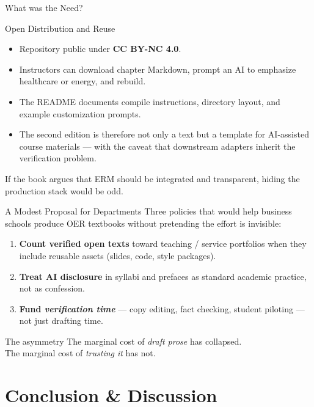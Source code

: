 \documentclass[11pt, aspectratio=169]{beamer}
\begin{document}
\begin{frame}{What was the Need?}
\begin{frame}{Open Distribution and Reuse}
\begin{itemize}
  \item Repository public under \textbf{CC BY-NC 4.0}.
  \item Instructors can download chapter Markdown, prompt an AI to emphasize
        healthcare or energy, and rebuild.
  \item The README documents compile instructions, directory layout,
        and example customization prompts.
  \item The second edition is therefore not only a text but a
        \alert{template} for AI-assisted course materials ---
        with the caveat that downstream adapters inherit the verification problem.
\end{itemize}
\medskip
\small If the book argues that ERM should be integrated and transparent,
hiding the production stack would be odd.
\end{frame}

\begin{frame}{A Modest Proposal for Departments}
Three policies that would help business schools produce OER textbooks without
pretending the effort is invisible:
\begin{enumerate}
  \item \textbf{Count verified open texts} toward teaching / service portfolios
        when they include reusable assets (slides, code, style packages).
  \item \textbf{Treat AI disclosure} in syllabi and prefaces as standard academic
        practice, not as confession.
  \item \textbf{Fund \emph{verification time}} --- copy editing, fact checking,
        student piloting --- not just drafting time.
\end{enumerate}
\medskip
\begin{alertblock}{The asymmetry}
The marginal cost of \emph{draft prose} has collapsed.\\
The marginal cost of \emph{trusting it} has not.
\end{alertblock}
\end{frame}

\section{Conclusion \& Discussion}


\end{frame}
\end{document}
